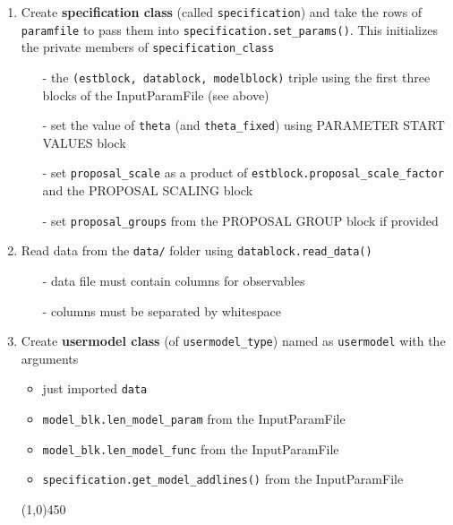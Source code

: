 \documentclass[11pt, letterpaper, notitlepage]{article}
\begin{document}
\begin{enumerate}
\item Create \textbf{specification class} (called \texttt{specification}) and take the rows of \texttt{paramfile} to pass them into \texttt{specification.set\_params()}. This initializes the private members of \texttt{specification\_class}
\begin{itemize}
\item[-] the \texttt{(estblock, datablock, modelblock)} triple using the first three blocks of the InputParamFile (see above)
\item[-] set the value of \texttt{theta} (and \texttt{theta\_fixed}) using PARAMETER START VALUES block
\item[-] set \texttt{proposal\_scale} as a product of \texttt{estblock.proposal\_scale\_factor} and the PROPOSAL SCALING block
\item[-] set \texttt{proposal\_groups} from the PROPOSAL GROUP block if provided
\end{itemize} 
\item Read data from the \texttt{data/} folder using \texttt{datablock.read\_data()}
\begin{itemize}
\item[-] data file must contain columns for observables
\item[-] columns must be separated by whitespace
\end{itemize}
\item Create \textbf{usermodel class} (of \texttt{usermodel\_type}) named as \texttt{usermodel} with the arguments
\begin{itemize}
\item just imported \texttt{data}
\item \texttt{model\_blk.len\_model\_param} from the InputParamFile
\item \texttt{model\_blk.len\_model\_func} from the InputParamFile
\item \texttt{specification.get\_model\_addlines()} from the InputParamFile 
\end{itemize}
 
\begin{center}
\line(1,0){450}
\end{center}


\end{enumerate}
\end{document}
